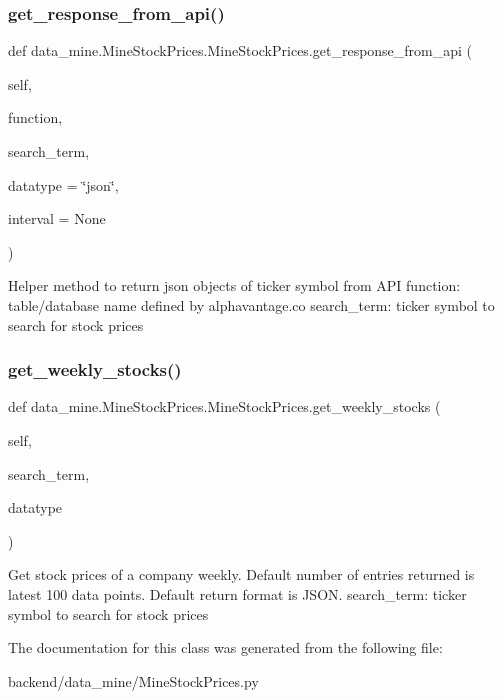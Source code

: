 \subsubsection{\texorpdfstring{get\+\_\+response\+\_\+from\+\_\+api()}{get\_response\_from\_api()}}
{\footnotesize\ttfamily def data\+\_\+mine.\+Mine\+Stock\+Prices.\+Mine\+Stock\+Prices.\+get\+\_\+response\+\_\+from\+\_\+api (\begin{DoxyParamCaption}\item[{}]{self,  }\item[{}]{function,  }\item[{}]{search\+\_\+term,  }\item[{}]{datatype = {\ttfamily \char`\"{}json\char`\"{}},  }\item[{}]{interval = {\ttfamily None} }\end{DoxyParamCaption})}

\begin{DoxyVerb}    Helper method to return json objects of ticker symbol from API
    function: table/database name defined by alphavantage.co
    search_term: ticker symbol to search for stock prices
\end{DoxyVerb}
 \mbox{\label{classdata__mine_1_1_mine_stock_prices_1_1_mine_stock_prices_a98f05c73f0e1d30d16d42eb7510d60de}} 
\subsubsection{\texorpdfstring{get\+\_\+weekly\+\_\+stocks()}{get\_weekly\_stocks()}}
{\footnotesize\ttfamily def data\+\_\+mine.\+Mine\+Stock\+Prices.\+Mine\+Stock\+Prices.\+get\+\_\+weekly\+\_\+stocks (\begin{DoxyParamCaption}\item[{}]{self,  }\item[{}]{search\+\_\+term,  }\item[{}]{datatype }\end{DoxyParamCaption})}

\begin{DoxyVerb}    Get stock prices of a company weekly.
    Default number of entries returned is latest 100 data points.
    Default return format is JSON.
    search_term: ticker symbol to search for stock prices
\end{DoxyVerb}
 

The documentation for this class was generated from the following file\+:\begin{DoxyCompactItemize}
\item 
backend/data\+\_\+mine/Mine\+Stock\+Prices.\+py\end{DoxyCompactItemize}
